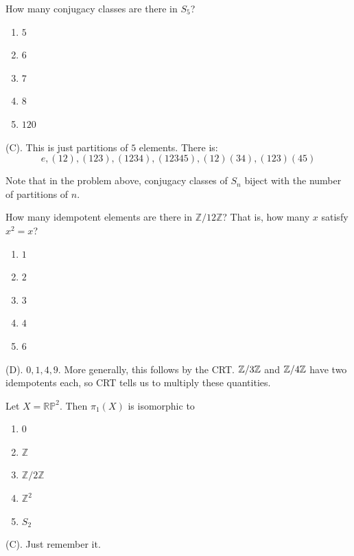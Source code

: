 \begin{exercise}
How many conjugacy classes are there in $S_5$?

\begin{enumerate}[label=(\Alph*)]
    \item $5$
    \item $6$
    \item $7$
    \item $8$
    \item $120$
\end{enumerate}
\end{exercise}
\begin{solution}
(C). This is just partitions of $5$ elements. There is:
\[
e, (12), (123), (1234), (12345), (12)(34), (123)(45)
\]
\end{solution}

\begin{remark}
Note that in the problem above, conjugacy classes of $S_n$ biject with the number of
partitions of $n$.
\end{remark}

\begin{exercise}
How many idempotent elements are there in $\mathbb{Z}/12\mathbb{Z}$? That is, how many $x$ satisfy $x^2=x$?

\begin{enumerate}[label=(\Alph*)]
    \item $1$
    \item $2$
    \item $3$
    \item $4$
    \item $6$
\end{enumerate}
\end{exercise}
\begin{solution}
(D). $0,1,4,9$. More generally, this follows by the CRT. $\mathbb{Z}/3\mathbb{Z}$ and $\mathbb{Z}/4\mathbb{Z}$ have two 
idempotents each, so CRT tells us to multiply these quantities.
\end{solution}

\begin{exercise}
Let $X=\mathbb{RP}^2$. Then $\pi_1(X)$ is isomorphic to
\begin{enumerate}[label=(\Alph*)]
    \item $0$
    \item $\mathbb{Z}$
    \item $\mathbb{Z}/2\mathbb{Z}$
    \item $\mathbb{Z}^2$
    \item $S_2$
\end{enumerate}
\end{exercise}
\begin{solution}
(C). Just remember it.
\end{solution}

